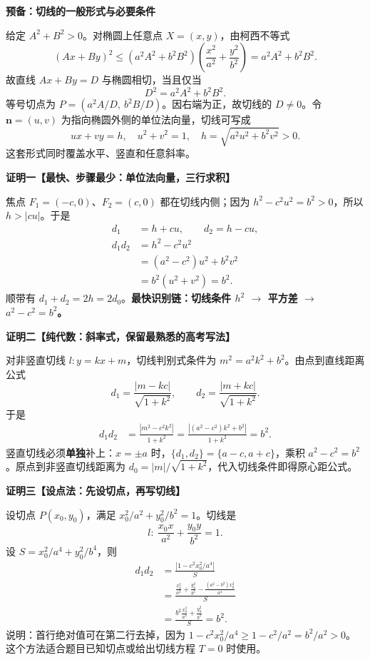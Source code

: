 \begin{proofbox}
\textbf{预备：切线的一般形式与必要条件}

给定 $A^2+B^2>0$。对椭圆上任意点 $X=(x,y)$，由柯西不等式
\[
(Ax+By)^2\le(a^2A^2+b^2B^2)
\left(\frac{x^2}{a^2}+\frac{y^2}{b^2}\right)
=a^2A^2+b^2B^2.
\]
故直线 $Ax+By=D$ 与椭圆相切，当且仅当
\[
\boxed{D^2=a^2A^2+b^2B^2}.
\]
等号切点为 $P=(a^2A/D,\ b^2B/D)$。因右端为正，故切线的 $D\ne0$。令 $\boldsymbol n=(u,v)$ 为指向椭圆外侧的单位法向量，切线可写成
\[
ux+vy=h,\quad u^2+v^2=1,\quad
h=\sqrt{a^2u^2+b^2v^2}>0.
\]
这套形式同时覆盖水平、竖直和任意斜率。

\medskip
\textbf{证明一【最快、步骤最少：单位法向量，三行求积】}

焦点 $F_1=(-c,0)$、$F_2=(c,0)$ 都在切线内侧；因为
$h^2-c^2u^2=b^2>0$，所以 $h>|cu|$。于是
\[
\begin{aligned}
d_1&=h+cu,\qquad d_2=h-cu,\\
d_1d_2&=h^2-c^2u^2\\
&=(a^2-c^2)u^2+b^2v^2\\
&=b^2(u^2+v^2)=\boxed{b^2}.
\end{aligned}
\]
顺带有 $d_1+d_2=2h=2d_0$。\textbf{最快识别链：切线条件 $h^2$ $\to$ 平方差 $\to$ $a^2-c^2=b^2$。}

\medskip
\textbf{证明二【纯代数：斜率式，保留最熟悉的高考写法】}

对非竖直切线 $l:y=kx+m$，切线判别式条件为 $m^2=a^2k^2+b^2$。由点到直线距离公式
\[
d_1=\frac{|m-kc|}{\sqrt{1+k^2}},\qquad
d_2=\frac{|m+kc|}{\sqrt{1+k^2}}.
\]
于是
\[
\begin{aligned}
d_1d_2
&=\frac{|m^2-c^2k^2|}{1+k^2}
=\frac{|(a^2-c^2)k^2+b^2|}{1+k^2}
=\boxed{b^2}.
\end{aligned}
\]
竖直切线必须\textbf{单独}补上：$x=\pm a$ 时，$\{d_1,d_2\}=\{a-c,a+c\}$，乘积 $a^2-c^2=b^2$。原点到非竖直切线距离为 $d_0=|m|/\sqrt{1+k^2}$，代入切线条件即得原心距公式。

\medskip
\textbf{证明三【设点法：先设切点，再写切线】}

设切点 $P(x_0,y_0)$，满足 $x_0^2/a^2+y_0^2/b^2=1$。切线是
\[
l:\ \frac{x_0x}{a^2}+\frac{y_0y}{b^2}=1.
\]
设 $S=x_0^2/a^4+y_0^2/b^4$，则
\[
\begin{aligned}
d_1d_2
&=\frac{\left|1-c^2x_0^2/a^4\right|}{S}\\
&=\frac{\displaystyle \frac{x_0^2}{a^2}+\frac{y_0^2}{b^2}-\frac{(a^2-b^2)x_0^2}{a^4}}{S}\\
&=\frac{\displaystyle b^2\frac{x_0^2}{a^4}+\frac{y_0^2}{b^2}}{S}
=\boxed{b^2}.
\end{aligned}
\]
说明：首行绝对值可在第二行去掉，因为 $1-c^2x_0^2/a^4\ge1-c^2/a^2=b^2/a^2>0$。这个方法适合题目已知切点或给出切线方程 $T=0$ 时使用。


\end{proofbox}
